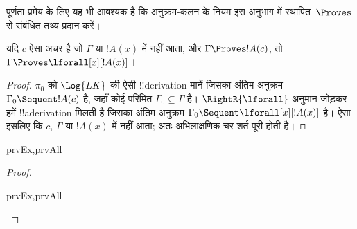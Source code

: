 \documentclass[../../../include/open-logic-section]{subfiles}
\begin{document}

\begin{explain}
  पूर्णता प्रमेय के लिए यह भी आवश्यक है कि अनुक्रम-कलन के नियम इस अनुभाग में
  स्थापित~$\Proves$ से संबंधित तथ्य प्रदान करें।
\end{explain}

\begin{thm}
 यदि $c$ ऐसा अचर है जो $\Gamma$ या
$!A(x)$ में नहीं आता, और $\Gamma \Proves !A(c)$, तो $\Gamma
\Proves \lforall[x][!A(x)]$।
\end{thm}

\begin{proof}
$\pi_0$ को $\Log{LK}$ की ऐसी !!{derivation} मानें जिसका अंतिम अनुक्रम
$\Gamma_0 \Sequent !A(c)$ है, जहाँ कोई परिमित $\Gamma_0 \subseteq \Gamma$
है। $\RightR{\lforall}$ अनुमान जोड़कर हमें !!a{derivation} मिलती है जिसका
अंतिम अनुक्रम $\Gamma_0 \Sequent
\lforall[x][!A(x)]$ है। ऐसा इसलिए कि $c$, $\Gamma$ या $!A(x)$ में नहीं आता;
अतः अभिलाक्षणिक-चर शर्त पूरी होती है।
\end{proof}

\begin{prop}
\begin{tagenumerate}{prvEx,prvAll}
\end{tagenumerate}
\end{prop}

\begin{proof}
\begin{tagenumerate}{prvEx,prvAll}
\end{tagenumerate}
\end{proof}
\end{document}
